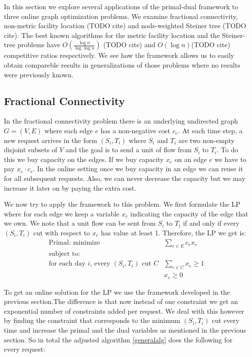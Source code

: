 In this section we explore several applications of the primal-dual framework to three online graph optimization problems. We examine fractional connectivity, non-metric facility location (TODO cite) and node-weighted Steiner tree (TODO cite). The best known algorithms for the metric facility location and the Steiner-tree problems have $O(\frac{ \log n }{ \log \log n} )$ (TODO cite) and $O({ \log n} )$(TODO cite) competitive ratios respectively. We see how the framework allows us to easily obtain compareble results in generalizations of those problems where no results were previously known.

\subsection{Fractional Connectivity}

In the fractional connectivity problem there is an underlying undirected graph $G = (V,E)$ where each edge $e$ has a non-negative cost $c_e$. At each time step, a new request arrives in the form $(S_i,T_i)$ where $S_i$ and $T_i$ are two non-empty disjoint subsets of $V$ and the goal is to send a unit of flow from $S_i$ to $T_i$. To do this we buy capacity on the edges. If we buy capacity $x_e$ on an edge $e$ we have to pay $x_e \cdot c_e$. In the online setting once we buy capacity in an edge we can reuse it for all subsequent requests. Also, we can never decrease the capacity but we may increase it later on by paying the extra cost.

We now try to apply the framework to this problem. We first formulate the LP where for each edge we keep a variable $x_e$ indicating the capacity of the edge that we own. We note that a unit flow can be sent from $S_i$ to $T_i$ if and only if every $(S_i, T_i)$ cut with respect to $x_e$ has value at least 1. Therefore, the LP we get is: 
\[
	\begin{array}{lr}
	\textrm{Primal: minimize}   & \sum_{e \in E} c_e x_e   \\
	\textrm{subject to:} & \\
	\textrm{for each day $i$, every $(S_i,T_i)$ cut $C$} & \sum_{e \in C} x_e  \ge 1  \\
			    & x_e \geq 0
	\end{array}
\]

To get an online solution for the LP we use the framework developed in the previous section.The difference is that now instead of one constraint we get an exponential number of constraints added per request. We deal with this however by finding the constraint that corresponds to the minimum $(S_i,T_i)$ cut every time and increase the primal and the dual variables as mentioned in the previous section. So in total the adjusted algorithm \ref{generalalg} does the following for every request:

